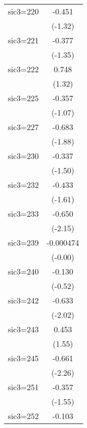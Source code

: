 \begin{table}[htbp]
\begin{tabular*}{0.8\hsize}{@{\hskip\tabcolsep\extracolsep\fill}l*{1}{c}}
\addlinespace
sic3=220            &      -0.451         \\
                    &     (-1.32)         \\
\addlinespace
sic3=221            &      -0.377         \\
                    &     (-1.35)         \\
\addlinespace
sic3=222            &       0.748         \\
                    &      (1.32)         \\
\addlinespace
sic3=225            &      -0.357         \\
                    &     (-1.07)         \\
\addlinespace
sic3=227            &      -0.683         \\
                    &     (-1.88)         \\
\addlinespace
sic3=230            &      -0.337         \\
                    &     (-1.50)         \\
\addlinespace
sic3=232            &      -0.433         \\
                    &     (-1.61)         \\
\addlinespace
sic3=233            &      -0.650\sym{*}  \\
                    &     (-2.15)         \\
\addlinespace
sic3=239            &   -0.000474         \\
                    &     (-0.00)         \\
\addlinespace
sic3=240            &      -0.130         \\
                    &     (-0.52)         \\
\addlinespace
sic3=242            &      -0.633\sym{*}  \\
                    &     (-2.02)         \\
\addlinespace
sic3=243            &       0.453         \\
                    &      (1.55)         \\
\addlinespace
sic3=245            &      -0.661\sym{*}  \\
                    &     (-2.26)         \\
\addlinespace
sic3=251            &      -0.357         \\
                    &     (-1.55)         \\
\addlinespace
sic3=252            &      -0.103         \\

\end{tabular*}
\end{table}
